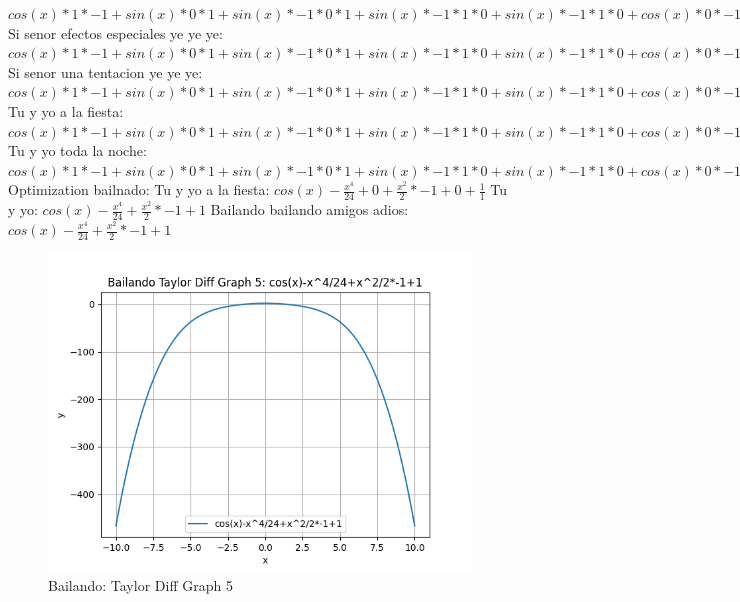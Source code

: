 \documentclass{article}
\begin{document}
${{{cos(x)*1*-1+sin(x)*0}*1+sin(x)*-1*0}*1+sin(x)*-1*1*0+sin(x)*-1*1*0+cos(x)*0}*-1+{sin(x)*-1*1*1+cos(x)*0}*0+{sin(x)*-1*1*1+cos(x)*0}*0+cos(x)*1*0$ Si senor efectos especiales ye ye ye: ${{{cos(x)*1*-1+sin(x)*0}*1+sin(x)*-1*0}*1+sin(x)*-1*1*0+sin(x)*-1*1*0+cos(x)*0}*-1+{sin(x)*-1*1*1+cos(x)*0}*0+{sin(x)*-1*1*1+cos(x)*0}*0+cos(x)*1*0+{sin(x)*-1*1*1+cos(x)*0}*0+cos(x)*1*0+cos(x)*1*0+sin(x)*0$ Si senor una tentacion ye ye ye: ${{{{cos(x)*1*-1+sin(x)*0}*1+sin(x)*-1*0}*1+sin(x)*-1*1*0+sin(x)*-1*1*0+cos(x)*0}*-1+{sin(x)*-1*1*1+cos(x)*0}*0+{sin(x)*-1*1*1+cos(x)*0}*0+cos(x)*1*0+{sin(x)*-1*1*1+cos(x)*0}*0+cos(x)*1*0+cos(x)*1*0+sin(x)*0}*1+{{sin(x)*-1*1*1+cos(x)*0}*-1+cos(x)*1*0+cos(x)*1*0+sin(x)*0}*0$ Tu y yo a la fiesta: ${{{{cos(x)*1*-1+sin(x)*0}*1+sin(x)*-1*0}*1+sin(x)*-1*1*0+sin(x)*-1*1*0+cos(x)*0}*-1+{sin(x)*-1*1*1+cos(x)*0}*0+{sin(x)*-1*1*1+cos(x)*0}*0+cos(x)*1*0+{sin(x)*-1*1*1+cos(x)*0}*0+cos(x)*1*0+cos(x)*1*0+sin(x)*0}*1+{{sin(x)*-1*1*1+cos(x)*0}*-1+cos(x)*1*0+cos(x)*1*0+sin(x)*0}*0+{{sin(x)*-1*1*1+cos(x)*0}*-1+cos(x)*1*0+cos(x)*1*0+sin(x)*0}*0+{cos(x)*1*-1+sin(x)*0}*0$ Tu y yo toda la noche: ${{{{cos(x)*1*-1+sin(x)*0}*1+sin(x)*-1*0}*1+sin(x)*-1*1*0+sin(x)*-1*1*0+cos(x)*0}*-1+{sin(x)*-1*1*1+cos(x)*0}*0+{sin(x)*-1*1*1+cos(x)*0}*0+cos(x)*1*0+{sin(x)*-1*1*1+cos(x)*0}*0+cos(x)*1*0+cos(x)*1*0+sin(x)*0}*1+{{sin(x)*-1*1*1+cos(x)*0}*-1+cos(x)*1*0+cos(x)*1*0+sin(x)*0}*0+{{sin(x)*-1*1*1+cos(x)*0}*-1+cos(x)*1*0+cos(x)*1*0+sin(x)*0}*0+{cos(x)*1*-1+sin(x)*0}*0+{{sin(x)*-1*1*1+cos(x)*0}*-1+cos(x)*1*0+cos(x)*1*0+sin(x)*0}*0+{cos(x)*1*-1+sin(x)*0}*0+{cos(x)*1*-1+sin(x)*0}*0+sin(x)*-1*0$  \newline \newline Optimization bailnado: \newline Tu y yo a la fiesta: $cos(x)-\frac{x^4}{24}+0+\frac{x^2}{2}*-1+0+\frac{1}{1}$  \newline Tu y yo: $cos(x)-\frac{x^4}{24}+\frac{x^2}{2}*-1+1$  \newline Bailando bailando amigos adios: $cos(x)-\frac{x^4}{24}+\frac{x^2}{2}*-1+1$  \newline \begin{figure}
\centering
\includegraphics[width=0.8\linewidth]{Bailando Taylor Diff Graph 5.png}
\caption{Bailando: Taylor Diff Graph 5}
\label{fig:my_image}
\end{figure}
\end{document}
